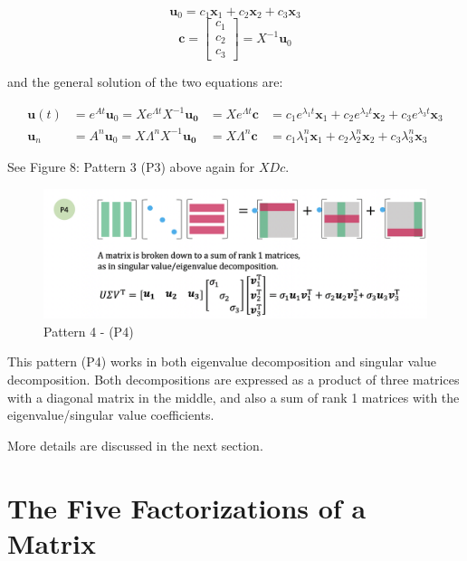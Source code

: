 \documentclass[letterpaper]{article}
\begin{document}
\begin{equation*}
  \bm{u}_0 = c_1 \bm{x}_1 + c_2 \bm{x}_2 + c_3 \bm{x}_3
\end{equation*}
\begin{equation*}
  \bm{c} =
  \begin{bmatrix}
    c_1\\
    c_2\\
    c_3
  \end{bmatrix} = X^{-1} \bm{u}_0
\end{equation*}

and the general solution of the two equations are:

\begin{align*}
  \bm{u}(t) &= e^{At} \bm{u}_0 = X e^{\Lambda t} X^{-1} \bm{u_0} &= X e^{\Lambda t} \bm{c} &= c_1 e^{\lambda_1 t} \bm{x}_1 + c_2 e^{\lambda_2 t} \bm{x}_2 + c_3 e^{\lambda_3 t} \bm{x}_3\\
  \bm{u}_n &= A^n \bm{u}_0 = X \Lambda^n X^{-1} \bm{u_0} &= X \Lambda^n \bm{c} &= c_1 \lambda_1^n \bm{x}_1 + c_2 \lambda_2^n \bm{x}_2 + c_3 \lambda_3^n \bm{x}_3
\end{align*}

See Figure 8: Pattern 3 (P3) above again for $XDc$.

\begin{figure}[H]
  \includegraphics[keepaspectratio, width=\linewidth]{Pattern4.png}
  \caption{Pattern 4 - (P4)}
\end{figure}

This pattern (P4) works in both eigenvalue decomposition and singular value decomposition.
Both decompositions are expressed as a product of three matrices with a diagonal matrix in the middle,
and also a sum of rank 1 matrices with the eigenvalue/singular value coefficients.

More details are discussed in the next section.

\clearpage

\section{The Five Factorizations of a Matrix}
\end{document}
